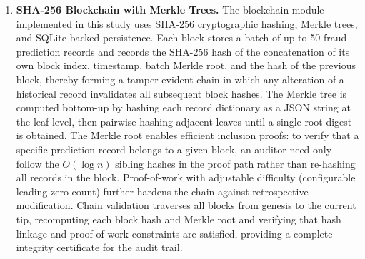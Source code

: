 \begin{enumerate}[label=\roman*.]
\textbf{Random Forest} is a bagging ensemble that trains a large number of
decision trees on bootstrap replicates of the training data, selecting a random
subset of features at each split node to decorrelate the individual trees
\cite{breiman2001}. Prediction is made by majority vote (classification) or
averaging (regression). Random Forest is particularly well suited to datasets
with moderate sample sizes and many features because the bagging variance
reduction complements the feature-subsampling bias reduction. Class imbalance is
addressed by setting \texttt{class\_weight=`balanced\_subsample'}, which reweights
samples by the inverse of their class frequency within each bootstrap subsample.
The number of trees, maximum depth, minimum samples per leaf, and the feature
subsampling fraction are included in the Optuna search.


\paragraph{Cross-Validation Feature Computation.}
All cross-provider features (z-score normalisations, percentile ranks, physician
billing statistics, and network metrics) are computed within each
cross-validation fold using only training-fold data, preventing information
leakage from test providers.

\item \textbf{SHA-256 Blockchain with Merkle Trees.}
The blockchain module implemented in this study uses SHA-256 cryptographic
hashing, Merkle trees, and SQLite-backed persistence. Each
block stores a batch of up to 50 fraud prediction records and records the
SHA-256 hash of the concatenation of its own block index, timestamp, batch
Merkle root, and the hash of the previous block, thereby forming a tamper-evident
chain in which any alteration of a historical record invalidates all subsequent
block hashes. The Merkle tree is computed bottom-up by hashing each record
dictionary as a JSON string at the leaf level, then pairwise-hashing adjacent
leaves until a single root digest is obtained. The Merkle root enables efficient
inclusion proofs: to verify that a specific prediction record belongs to a given
block, an auditor need only follow the $O(\log n)$ sibling hashes in the proof
path rather than re-hashing all records in the block. Proof-of-work with
adjustable difficulty (configurable leading zero count) further hardens the chain
against retrospective modification. Chain validation traverses all blocks from
genesis to the current tip, recomputing each block hash and Merkle root and
verifying that hash linkage and proof-of-work constraints are satisfied, providing
a complete integrity certificate for the audit trail.


\end{enumerate}
